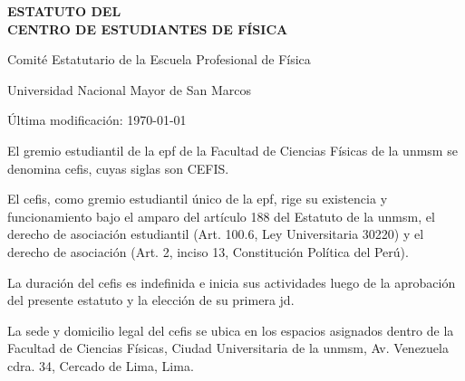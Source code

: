\documentclass[11pt]{article}
\newcommand{\DocNom}{ESTATUTO DEL\\CENTRO DE ESTUDIANTES DE FÍSICA}
\newcommand{\DocFecha}{\today}
\newcommand{\DocAutor}{Comité Estatutario de la Escuela Profesional de Física}
\newcommand{\DocUniversidad}{Universidad Nacional Mayor de San Marcos}
\begin{document}
\begin{titlepage}
    \begin{center}
        \null%
        \vfill

        {\sffamily\bfseries\fontsize{16}{19}\selectfont \DocNom\par}

        \vspace{0.5cm}

        {\sffamily\Large \DocAutor\par}
        \vspace{0.25cm}
        {\sffamily\small \DocUniversidad\par}

        \vfill
        {\sffamily\normalsize Última modificación: \DocFecha\par}
    \end{center}
\end{titlepage}

\tableofcontents
\clearpage
{}

\clearpage
\printglossary[type=\acronymtype, title={Abreviaciones}]



El gremio estudiantil de la \gls{epf} de la Facultad de Ciencias Físicas de la \gls{unmsm} se denomina \gls{cefis}, cuyas siglas son CEFIS.\@{}

El \gls{cefis}, como gremio estudiantil único de la \gls{epf}, rige su existencia y funcionamiento bajo el amparo del artículo 188 del Estatuto de la \gls{unmsm}, el derecho de asociación estudiantil (Art. 100.6, Ley Universitaria 30220) y el derecho de asociación (Art. 2, inciso 13, Constitución Política del Perú).

La duración del \gls{cefis} es indefinida e inicia sus actividades luego de la aprobación del presente \gls{estatuto} y la elección de su primera \gls{jd}.

La sede y domicilio legal del \gls{cefis} se ubica en los espacios asignados dentro de la Facultad de Ciencias Físicas, Ciudad Universitaria de la \gls{unmsm}, Av. Venezuela cdra. 34, Cercado de Lima, Lima.
\end{document}

